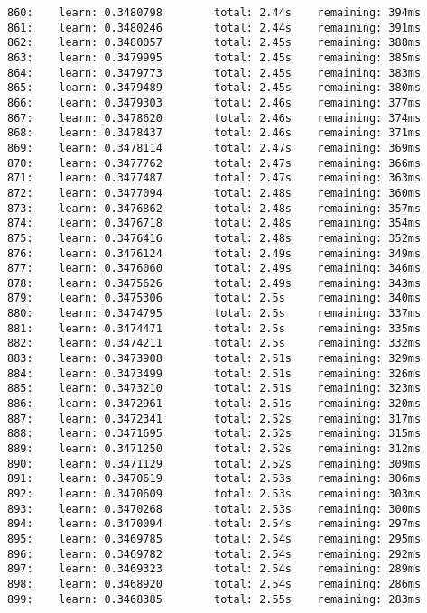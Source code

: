 \documentclass[11pt]{article}
\begin{document}
\begin{Verbatim}[commandchars=\\\{\}]
860:    learn: 0.3480798        total: 2.44s    remaining: 394ms
861:    learn: 0.3480246        total: 2.44s    remaining: 391ms
862:    learn: 0.3480057        total: 2.45s    remaining: 388ms
863:    learn: 0.3479995        total: 2.45s    remaining: 385ms
864:    learn: 0.3479773        total: 2.45s    remaining: 383ms
865:    learn: 0.3479489        total: 2.45s    remaining: 380ms
866:    learn: 0.3479303        total: 2.46s    remaining: 377ms
867:    learn: 0.3478620        total: 2.46s    remaining: 374ms
868:    learn: 0.3478437        total: 2.46s    remaining: 371ms
869:    learn: 0.3478114        total: 2.47s    remaining: 369ms
870:    learn: 0.3477762        total: 2.47s    remaining: 366ms
871:    learn: 0.3477487        total: 2.47s    remaining: 363ms
872:    learn: 0.3477094        total: 2.48s    remaining: 360ms
873:    learn: 0.3476862        total: 2.48s    remaining: 357ms
874:    learn: 0.3476718        total: 2.48s    remaining: 354ms
875:    learn: 0.3476416        total: 2.48s    remaining: 352ms
876:    learn: 0.3476124        total: 2.49s    remaining: 349ms
877:    learn: 0.3476060        total: 2.49s    remaining: 346ms
878:    learn: 0.3475626        total: 2.49s    remaining: 343ms
879:    learn: 0.3475306        total: 2.5s     remaining: 340ms
880:    learn: 0.3474795        total: 2.5s     remaining: 337ms
881:    learn: 0.3474471        total: 2.5s     remaining: 335ms
882:    learn: 0.3474211        total: 2.5s     remaining: 332ms
883:    learn: 0.3473908        total: 2.51s    remaining: 329ms
884:    learn: 0.3473499        total: 2.51s    remaining: 326ms
885:    learn: 0.3473210        total: 2.51s    remaining: 323ms
886:    learn: 0.3472961        total: 2.51s    remaining: 320ms
887:    learn: 0.3472341        total: 2.52s    remaining: 317ms
888:    learn: 0.3471695        total: 2.52s    remaining: 315ms
889:    learn: 0.3471250        total: 2.52s    remaining: 312ms
890:    learn: 0.3471129        total: 2.52s    remaining: 309ms
891:    learn: 0.3470619        total: 2.53s    remaining: 306ms
892:    learn: 0.3470609        total: 2.53s    remaining: 303ms
893:    learn: 0.3470268        total: 2.53s    remaining: 300ms
894:    learn: 0.3470094        total: 2.54s    remaining: 297ms
895:    learn: 0.3469785        total: 2.54s    remaining: 295ms
896:    learn: 0.3469782        total: 2.54s    remaining: 292ms
897:    learn: 0.3469323        total: 2.54s    remaining: 289ms
898:    learn: 0.3468920        total: 2.54s    remaining: 286ms
899:    learn: 0.3468385        total: 2.55s    remaining: 283ms

\end{Verbatim}
\end{document}
